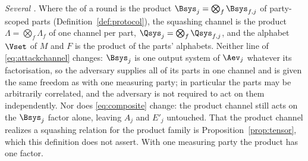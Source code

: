 \begin{definition}
\emph{Several .} Where the  of a
round is the product $\Bsys_j=\bigotimes_f\Bsys_{f,j}$ of party-scoped parts
(Definition~\ref{def:protocol}), the squashing channel is the product
$\Lambda=\bigotimes_f\Lambda_f$ of one channel per part,
$\Qsys_j=\bigotimes_f\Qsys_{f,j}$, and the alphabet $\Vset$ of $M$ and $F$ is
the product of the parts' alphabets. Neither line of \eqref{eq:attackchannel} changes:
$\Bsys_j$ is one output system of $\Aev_j$ whatever its factorisation, so the
adversary supplies all of its parts in one channel and is given the same
freedom as with one measuring party; in particular the parts may be
arbitrarily correlated, and the adversary is not required to act on them
independently. Nor does \eqref{eq:composite} change: the product channel
still acts on the $\Bsys_j$ factor alone, leaving $A_j$ and $E'_j$ untouched.
That the product channel realizes a squashing relation for the product family
is Proposition~\ref{prop:tensor}, which this definition does not assert. With
one measuring party the product has one factor.
\end{definition}
